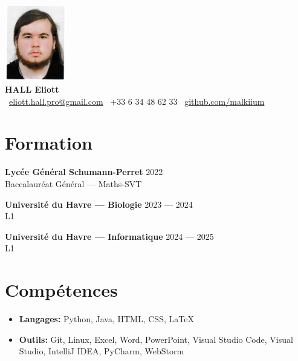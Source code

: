 \documentclass[a4paper,10pt]{article}
\begin{document}
\pagecolor{bgcolor} %
\pagestyle{empty}

\begin{center}
    \includegraphics[width=0.2\textwidth]{cvpp.png} \\
    \vspace{3mm}
    {\Huge \textbf{HALL Eliott}}\\
    \vspace{5mm}
    \faEnvelope~\href{mailto:eliott.hall.pro@gmail.com}{eliott.hall.pro@gmail.com} \quad
    \faPhone~+33 6 34 48 62 33 \quad
    \faGithub~\href{https://github.com/malkiium}{github.com/malkiium}
\end{center}

\vspace{5mm}

\section{Formation}
\textbf{Lycée Général Schumann-Perret} \hfill {2022}\\
{\color{accentcolor}Baccalauréat Général --- Maths-SVT}

\vspace{3mm}
\textbf{Université du Havre --- Biologie} \hfill {2023 --- 2024}\\
{\color{accentcolor}L1}

\vspace{3mm}
\textbf{Université du Havre --- Informatique} \hfill {2024 --- 2025}\\
{\color{accentcolor}L1}

\vspace{5mm}

\section{Compétences}
\begin{itemize}[label=\textbullet, font=\color{maincolor}\large]
    \item \textbf{Langages:} Python, Java, HTML, CSS, LaTeX
    \item \textbf{Outils:} Git, Linux, Excel, Word, PowerPoint, Visual Studio Code, Visual Studio, IntelliJ IDEA, PyCharm, WebStorm
\end{itemize}
\end{document}
